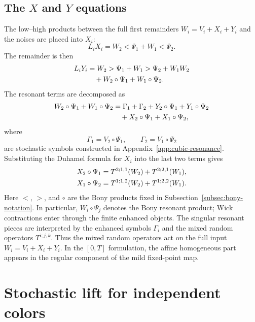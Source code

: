 \documentclass[10pt]{amsart}
\numberwithin{equation}{section}
\theoremstyle{plain}
\theoremstyle{definition}
\theoremstyle{remark}
\begin{document}
\subsection{The \texorpdfstring{$X$}{X} and \texorpdfstring{$Y$}{Y} equations}
The low--high products between the full first remainders $W_i=V_i+X_i+Y_i$ and the noises are placed into $X_i$:
\begin{equation}\label{eq:X-eq}
L_iX_i=W_2<\Psi_1+W_1<\Psi_2.
\end{equation}
The remainder is then
\begin{align}\label{eq:Y-eq}
L_iY_i
&=W_2>\Psi_1+W_1>\Psi_2+W_1W_2
\notag\\
&\quad+W_2\circ\Psi_1+W_1\circ\Psi_2.
\end{align}
The resonant terms are decomposed as
\begin{align}\label{eq:res-split-W}
W_2\circ\Psi_1+W_1\circ\Psi_2
&=\Gamma_1+\Gamma_2+Y_2\circ\Psi_1+Y_1\circ\Psi_2
\notag\\
&\quad+X_2\circ\Psi_1+X_1\circ\Psi_2,
\end{align}
where
\[
\Gamma_1=V_2\circ\Psi_1,
\qquad
\Gamma_2=V_1\circ\Psi_2
\]
are stochastic symbols constructed in Appendix~\ref{app:cubic-resonance}. Substituting the Duhamel formula for $X_i$ into the last two terms gives
\begin{align}\label{eq:X-res-random-operators}
X_2\circ\Psi_1&=T^{2;1,1}(W_2)+T^{2;2,1}(W_1),
\notag\\
X_1\circ\Psi_2&=T^{1;1,2}(W_2)+T^{1;2,2}(W_1).
\end{align}
Here $<$, $>$, and $\circ$ are the Bony products fixed in Subsection~\ref{subsec:bony-notation}.  In particular, $W_i\circ\Psi_j$ denotes the Bony resonant product; Wick contractions enter through the finite enhanced objects.  The singular resonant pieces are interpreted by the enhanced symbols $\Gamma_i$ and the mixed random operators $T^{i;j,k}$.  Thus the mixed random operators act on the full input $W_i=V_i+X_i+Y_i$.  In the $[0,T]$ formulation, the affine homogeneous part appears in the regular component of the mild fixed-point map.

\section{Stochastic lift for independent colors}\label{sec:stoch-lift}
\end{document}
